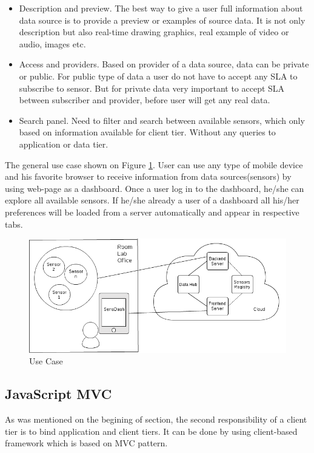 \begin{itemize}
      \item Description and preview. The best way to give a user full information about data source is to provide a preview or examples of source data. It is not only description but also real-time drawing graphics, real example of video or audio, images etc.
      \item Access and providers. Based on provider of a data source, data can be private or public. For public type of data a user do not have to accept any SLA to subscribe to sensor. But for private data very important to accept SLA between subscriber and provider, before user will get any real data.
      \item Search panel. Need to filter and search between available sensors, which only based on information available for client tier. Without any queries to application or data tier.
      \end{itemize}

    The general use case shown on Figure \ref{img:use_case_basic}. User can use any type of mobile device and his favorite browser to receive information from data sources(sensors) by using web-page as a dashboard. Once a user log in to the dashboard, he/she can explore all available sensors. If he/she already a user of a dashboard all his/her preferences will be loaded from a server automatically and appear in respective tabs.

        \begin{figure}[!ht]
        \centering
        \includegraphics[scale=0.6]{images/User_Case.png}   
        \caption[Use Case]{Use Case}
        \label{img:use_case_basic}                        
        \end{figure}

    \subsection{JavaScript MVC}
    As was mentioned on the begining of section, the second responsibility of a client tier is to bind application and client tiers. It can be done by using client-based framework which is based on MVC pattern.

